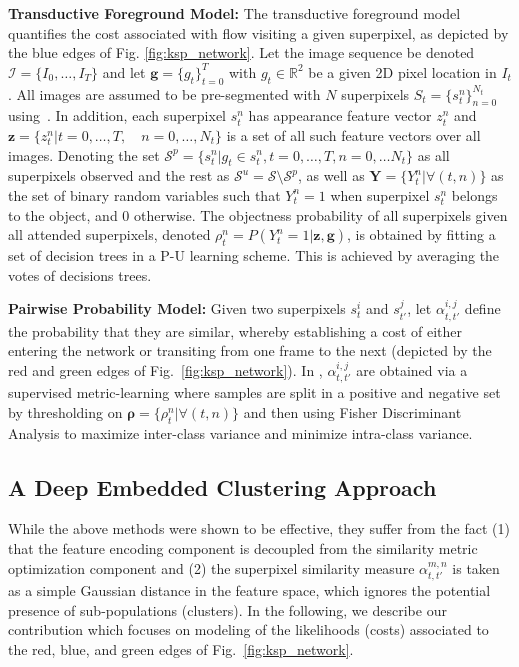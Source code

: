 \textbf{Transductive Foreground Model: }
The transductive foreground model quantifies the cost associated with flow visiting a given superpixel, as depicted by the blue edges of Fig. \ref{fig:ksp_network}. Let the image sequence be denoted $\mathcal{I} = \{I_0,\ldots,I_T\}$ and let $\bm{g} = \{g_t\}_{t=0}^T$ with $g_t\in\mathbb{R}^2$ be a given 2D pixel location in $I_t$.
All images are assumed to be pre-segmented with $N$ superpixels $S_t=\{s^n_t\}_{n=0}^{N_t}$ using~\cite{achanta2012}.
In addition, each superpixel $s_t^n$ has appearance feature vector $z_t^n$ and $\bm{z}=\{z_t^n | t=0,\ldots,T,\quad n=0,\ldots,N_t\}$ is a set of all such feature vectors over all images.
Denoting the set $\mathcal{S}^p = \{s^n_t | g_t \in s^n_t, t=0,\ldots,T,n=0,\ldots N_t \}$ as all superpixels observed and the rest as $\mathcal{S}^u = \mathcal{S} \setminus \mathcal{S}^p$, as well as $\bm{Y} = \{Y_t^n|\forall(t,n)\}$ as the set of binary random variables such that $Y_t^n=1$ when superpixel $s_t^n$ belongs to the object, and $0$ otherwise. The objectness probability of all superpixels given all attended superpixels, denoted $\rho_{t}^n = P(Y_t^n = 1 | \bm{z}, \bm{g})$, is obtained by fitting a set of decision trees in a P-U learning scheme. This is achieved by averaging the votes of decisions trees.

\textbf{Pairwise Probability Model: }
Given two superpixels $s_t^i$ and $s_{t'}^j$, let $\alpha_{t,t'}^{i,j}$ define the probability that they are similar, whereby establishing a cost of either entering the network or transiting from one frame to the next (\ie depicted by the red and green edges of Fig.~\ref{fig:ksp_network}). In \cite{lejeune18}, $\alpha_{t,t'}^{i,j}$ are obtained via a supervised metric-learning where samples are split in a positive and negative set by thresholding on $\bm{\rho} = \{ \rho_t^n | \forall(t,n)\}$
 and then using Fisher Discriminant Analysis \cite{welling05} to maximize inter-class variance and minimize intra-class variance.

\subsection{A Deep Embedded Clustering Approach}
\label{sec:dec}
While the above methods were shown to be effective, they suffer from the fact (1) that the feature encoding component is decoupled from the similarity metric optimization component and (2) the superpixel similarity measure $\alpha_{t,t'}^{m,n}$ is taken as a simple Gaussian distance in the feature space, which ignores the potential presence of sub-populations (clusters). In the following, we describe our contribution which focuses on modeling of the likelihoods (costs) associated to the red, blue, and green edges of Fig.~\ref{fig:ksp_network}.

